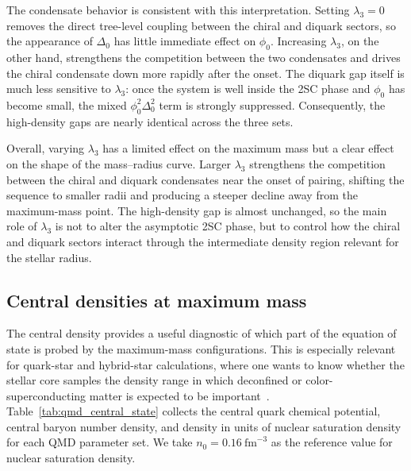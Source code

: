 The condensate behavior is consistent with this interpretation. Setting
\(\lambda_3=0\) removes the direct tree-level coupling between the
chiral and diquark sectors, so the appearance of \(\Delta_0\) has little
immediate effect on \(\phi_0\). Increasing \(\lambda_3\), on the other
hand, strengthens the competition between the two condensates and drives
the chiral condensate down more rapidly after the onset. The diquark gap
itself is much less sensitive to \(\lambda_3\): once the system is well
inside the 2SC phase and \(\phi_0\) has become small, the mixed
\(\phi_0^2\Delta_0^2\) term is strongly suppressed. Consequently, the
high-density gaps are nearly identical across the three sets.

Overall, varying \(\lambda_3\) has a limited effect on the maximum mass
but a clear effect on the shape of the mass--radius curve. Larger
\(\lambda_3\) strengthens the competition between the chiral and diquark
condensates near the onset of pairing, shifting the sequence to smaller
radii and producing a steeper decline away from the maximum-mass point.
The high-density gap is almost unchanged, so the main role of
\(\lambda_3\) is not to alter the asymptotic 2SC phase, but to control
how the chiral and diquark sectors interact through the intermediate
density region relevant for the stellar radius.

\subsection*{Central densities at maximum mass}
\label{subsec:qmd_central_densities}

The central density provides a useful diagnostic of which part of the
equation of state is probed by the maximum-mass configurations. This is
especially relevant for quark-star and hybrid-star calculations, where
one wants to know whether the stellar core samples the density range in
which deconfined or color-superconducting matter is expected to be
important~\cite{Alford2008,Andersen2026}. Table~\ref{tab:qmd_central_state}
collects the central quark chemical potential, central baryon number
density, and density in units of nuclear saturation density for each
QMD parameter set. We take \(n_0=0.16~\mathrm{fm}^{-3}\) as the reference value for
nuclear saturation density. 

